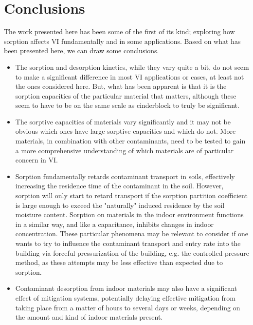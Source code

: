 \section{Conclusions}\label{sec:conclusions}

The work presented here has been some of the first of its kind; exploring how sorption affects VI fundamentally and in some applications.
Based on what has been presented here, we can draw some conclusions.
\begin{itemize}
  \item The sorption and desorption kinetics, while they vary quite a bit, do not seem to make a significant difference in most VI applications or cases, at least not the ones considered here. But, what has been apparent is that it is the sorption capacities of the particular material that matters, although these seem to have to be on the same scale as cinderblock to truly be significant.
  \item The sorptive capacities of materials vary significantly and it may not be obvious which ones have large sorptive capacities and which do not. More materials, in combination with other contaminants, need to be tested to gain a more comprehensive understanding of which materials are of particular concern in VI.
  \item Sorption fundamentally retards contaminant transport in soils, effectively increasing the residence time of the contaminant in the soil. However, sorption will only start to retard transport if the sorption partition coefficient is large enough to exceed the "naturally" induced residence by the soil moisture content. Sorption on materials in the indoor environment functions in a similar way, and like a capacitance, inhibits changes in indoor concentration. These particular phenomena may be relevant to consider if one wants to try to influence the contaminant transport and entry rate into the building via forceful pressurization of the building, e.g. the controlled pressure method, as these attempts may be less effective than expected due to sorption.
  \item Contaminant desorption from indoor materials may also have a significant effect of mitigation systems, potentially delaying effective mitigation from taking place from a matter of hours to several days or weeks, depending on the amount and kind of indoor materials present.
\end{itemize}
